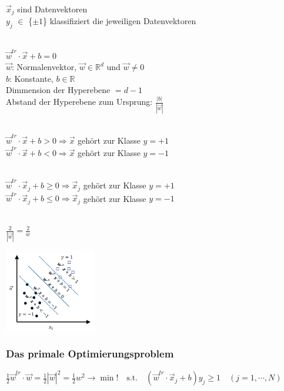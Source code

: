 $\vec{x}_j$ sind Datenvektoren\\
$y_j$ $\in $ \{$\pm 1$\} klassifiziert die jeweiligen Datenvektoren
\newline
\begin{minipage}[]{0.56\columnwidth}
    \\
    $\boxed{\vec{w}^{tr}\cdot\vec{x}+b=0}$ \\
    $\vec{w}$: Normalenvektor, $\vec{w} \in \mathbb{R}^d$ und $\vec{w} \neq 0$\\
    $b$: Konstante, $b \in \mathbb{R}$\\
    Dimmension der Hyperebene $= d-1$\\
    Abstand der Hyperebene zum Ursprung: $\frac{\left\lvert b \right\rvert }{\left\lvert \vec{w}\right\rvert }$
    \medskip

    \\
    $\boxed{\vec{w}^{tr}\cdot\vec{x}+b>0} \Rightarrow \vec{x} $ gehört zur Klasse $y = +1$\\
    $\boxed{\vec{w}^{tr}\cdot\vec{x}+b<0} \Rightarrow \vec{x} $ gehört zur Klasse $y = -1$
    \medskip

    \\
    $\boxed{\vec{w}^{tr}\cdot\vec{x}_j+b \geq 0} \Rightarrow \vec{x}_j $ gehört zur Klasse $y = +1$\\
    $\boxed{\vec{w}^{tr}\cdot\vec{x}_j+b\leq 0} \Rightarrow \vec{x}_j $ gehört zur Klasse $y = -1$
    \medskip

    \\
    $\boxed{\frac{2}{\left\lvert \vec{w}\right\rvert }=\frac{2}{w}}$
\end{minipage}\hfill
\begin{minipage}[t]{0.4\columnwidth}
    \includegraphics[width=4cm]{images/7_model_values.png}
\end{minipage}

\subsubsection{Das primale Optimierungsproblem}
$\boxed{\frac12\vec{w}^{tr}\cdot\vec{w}=\frac12\left|\vec{w}\right|^2=\frac12w^2\to\min!\quad\mathrm{s.t.}\quad\left(\vec{w}^{tr}\cdot\vec{x}_j+b\right)y_j\geq1\quad\left(j=1,\cdots,N\right)}$

